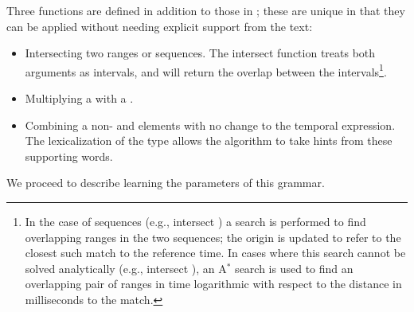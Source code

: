 Three functions are defined in addition to those in ;
	these are unique in that they can be applied without needing explicit 
	support from the text:

\begin{itemize}
	\item Intersecting two ranges or sequences.
		The intersect function treats both arguments as intervals, and will return
			the overlap between the intervals\footnote{
				In the case of sequences (e.g.,  intersect ) a
					search is performed to find overlapping ranges in the two sequences;
					the origin is updated to refer to the closest such
					match to the reference time.
				In cases where this search cannot be solved analytically
					(e.g.,  intersect ), an A$^{*}$
					search is used to find an overlapping pair of ranges
					in time logarithmic with respect to
					the distance in milliseconds to the match.
		}.
	\item Multiplying a  with a .
	\item Combining a non- and  elements with no change to the
			temporal expression.
		The lexicalization of the  type allows the algorithm
			to take hints from these supporting words.
\end{itemize}

We proceed to describe learning the parameters of this grammar.

